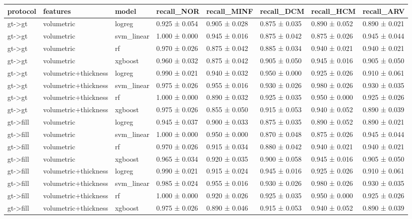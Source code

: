\begin{tabular}{llllllll}
\toprule
protocol & features & model & recall\_NOR & recall\_MINF & recall\_DCM & recall\_HCM & recall\_ARV \\
\midrule
gt->gt & volumetric & logreg & 0.925 ± 0.054 & 0.905 ± 0.028 & 0.875 ± 0.035 & 0.890 ± 0.052 & 0.890 ± 0.021 \\
gt->gt & volumetric & svm\_linear & 1.000 ± 0.000 & 0.945 ± 0.016 & 0.875 ± 0.042 & 0.875 ± 0.026 & 0.945 ± 0.044 \\
gt->gt & volumetric & rf & 0.970 ± 0.026 & 0.875 ± 0.042 & 0.885 ± 0.034 & 0.940 ± 0.021 & 0.940 ± 0.021 \\
gt->gt & volumetric & xgboost & 0.960 ± 0.032 & 0.875 ± 0.042 & 0.905 ± 0.050 & 0.945 ± 0.016 & 0.905 ± 0.050 \\
gt->gt & volumetric+thickness & logreg & 0.990 ± 0.021 & 0.940 ± 0.032 & 0.950 ± 0.000 & 0.925 ± 0.026 & 0.910 ± 0.061 \\
gt->gt & volumetric+thickness & svm\_linear & 0.975 ± 0.026 & 0.955 ± 0.016 & 0.930 ± 0.026 & 0.980 ± 0.026 & 0.930 ± 0.035 \\
gt->gt & volumetric+thickness & rf & 1.000 ± 0.000 & 0.890 ± 0.032 & 0.925 ± 0.035 & 0.950 ± 0.000 & 0.925 ± 0.026 \\
gt->gt & volumetric+thickness & xgboost & 0.975 ± 0.026 & 0.855 ± 0.050 & 0.915 ± 0.053 & 0.940 ± 0.052 & 0.890 ± 0.039 \\
gt->fill & volumetric & logreg & 0.945 ± 0.037 & 0.900 ± 0.033 & 0.875 ± 0.035 & 0.890 ± 0.052 & 0.890 ± 0.021 \\
gt->fill & volumetric & svm\_linear & 1.000 ± 0.000 & 0.950 ± 0.000 & 0.870 ± 0.048 & 0.875 ± 0.026 & 0.945 ± 0.044 \\
gt->fill & volumetric & rf & 0.970 ± 0.026 & 0.915 ± 0.034 & 0.880 ± 0.042 & 0.940 ± 0.021 & 0.940 ± 0.021 \\
gt->fill & volumetric & xgboost & 0.965 ± 0.034 & 0.920 ± 0.035 & 0.900 ± 0.058 & 0.945 ± 0.016 & 0.905 ± 0.050 \\
gt->fill & volumetric+thickness & logreg & 0.990 ± 0.021 & 0.915 ± 0.024 & 0.945 ± 0.016 & 0.925 ± 0.026 & 0.910 ± 0.061 \\
gt->fill & volumetric+thickness & svm\_linear & 0.985 ± 0.024 & 0.955 ± 0.016 & 0.930 ± 0.026 & 0.980 ± 0.026 & 0.930 ± 0.035 \\
gt->fill & volumetric+thickness & rf & 1.000 ± 0.000 & 0.920 ± 0.026 & 0.925 ± 0.035 & 0.950 ± 0.000 & 0.925 ± 0.026 \\
gt->fill & volumetric+thickness & xgboost & 0.975 ± 0.026 & 0.890 ± 0.046 & 0.915 ± 0.053 & 0.940 ± 0.052 & 0.890 ± 0.039 \\

\end{tabular}
